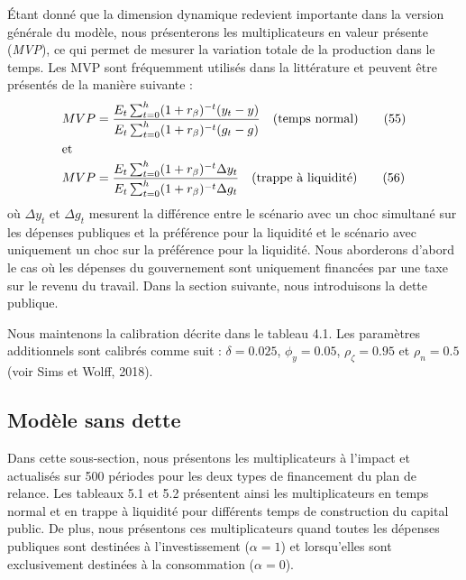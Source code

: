 \documentclass[12pt,letterpaper]{article}
\newcommand{\Et}{E_t}
\newcommand{\T}{\mathbb{T}}
\begin{document}
Étant donné que la dimension dynamique redevient importante dans la version générale du modèle, nous présenterons les multiplicateurs en valeur présente (\emph{MVP}), ce qui permet de mesurer la variation totale de la production dans le temps. Les MVP sont fréquemment utilisés dans la littérature et peuvent être présentés de la manière suivante :
\begin{align}
MVP &= \frac{\Et\sum_{t=0}^{h}(1+r_\beta)^{-t}(y_t - y)}{\Et\sum_{t=0}^{h}(1+r_\beta)^{-t}(g_t - g)} \quad \text{(temps normal)} \tag{55}\\
\intertext{et}
MVP &= \frac{\Et\sum_{t=0}^{h}(1+r_\beta)^{-t}\Delta y_t}{\Et\sum_{t=0}^{h}(1+r_\beta)^{-t}\Delta g_t} \quad \text{(trappe à liquidité)} \tag{56}
\end{align}
où $\Delta y_t$ et $\Delta g_t$ mesurent la différence entre le scénario avec un choc simultané sur les dépenses publiques et la préférence pour la liquidité et le scénario avec uniquement un choc sur la préférence pour la liquidité. Nous aborderons d’abord le cas où les dépenses du gouvernement sont uniquement financées par une taxe sur le revenu du travail. Dans la section suivante, nous introduisons la dette publique.

Nous maintenons la calibration décrite dans le tableau 4.1. Les paramètres additionnels sont calibrés comme suit : $\delta = 0.025$, $\phi_y = 0.05$, $\rho_\zeta = 0.95$ et $\rho_n = 0.5$ (voir Sims et Wolff, 2018).

\subsection{Modèle sans dette}

Dans cette sous-section, nous présentons les multiplicateurs à l’impact et actualisés sur 500 périodes pour les deux types de financement du plan de relance. Les tableaux 5.1 et 5.2 présentent ainsi les multiplicateurs en temps normal et en trappe à liquidité pour différents temps de construction du capital public. De plus, nous présentons ces multiplicateurs quand toutes les dépenses publiques sont destinées à l’investissement ($\alpha = 1$) et lorsqu’elles sont exclusivement destinées à la consommation ($\alpha = 0$).

\newcommand{\multtable}[9]{%
\begin{tabular}{llccc}
\toprule
& & $\alpha = 0$ & \multicolumn{2}{c}{$\alpha = 1$}\\
& & & $\T = 1$ & $\T = 16$\\
\midrule
\multirow{2}{*}{\textbf{Impact}} & Temps normal & #1 & #2 & #3\\
 & Trappe à liquidité & #4 & #5 & #6\\
\multirow{2}{*}{\textbf{\emph{MVP} sur 500 périodes}} & Temps normal & #7 & #8 & #9\\
}
\end{document}
